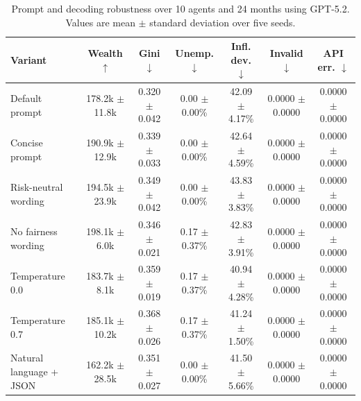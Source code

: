\ifdefined\FinEvoAllowHistoricalPrePZeroEvidence\else
{}
\fi
\begin{table}[t]
\centering
\small
\setlength{\tabcolsep}{4pt}
\begin{tabular}{lcccccc}
\toprule
Variant & Wealth $\uparrow$ & Gini $\downarrow$ & Unemp. $\downarrow$ & Infl. dev. $\downarrow$ & Invalid $\downarrow$ & API err. $\downarrow$ \\
\midrule
Default prompt & 178.2k $\pm$ 11.8k & 0.320 $\pm$ 0.042 & 0.00 $\pm$ 0.00\% & 42.09 $\pm$ 4.17\% & 0.0000 $\pm$ 0.0000 & 0.0000 $\pm$ 0.0000 \\
Concise prompt & 190.9k $\pm$ 12.9k & 0.339 $\pm$ 0.033 & 0.00 $\pm$ 0.00\% & 42.64 $\pm$ 4.59\% & 0.0000 $\pm$ 0.0000 & 0.0000 $\pm$ 0.0000 \\
Risk-neutral wording & 194.5k $\pm$ 23.9k & 0.349 $\pm$ 0.042 & 0.00 $\pm$ 0.00\% & 43.83 $\pm$ 3.83\% & 0.0000 $\pm$ 0.0000 & 0.0000 $\pm$ 0.0000 \\
No fairness wording & 198.1k $\pm$ 6.0k & 0.346 $\pm$ 0.021 & 0.17 $\pm$ 0.37\% & 42.83 $\pm$ 3.91\% & 0.0000 $\pm$ 0.0000 & 0.0000 $\pm$ 0.0000 \\
Temperature 0.0 & 183.7k $\pm$ 8.1k & 0.359 $\pm$ 0.019 & 0.17 $\pm$ 0.37\% & 40.94 $\pm$ 4.28\% & 0.0000 $\pm$ 0.0000 & 0.0000 $\pm$ 0.0000 \\
Temperature 0.7 & 185.1k $\pm$ 10.2k & 0.368 $\pm$ 0.026 & 0.17 $\pm$ 0.37\% & 41.24 $\pm$ 1.50\% & 0.0000 $\pm$ 0.0000 & 0.0000 $\pm$ 0.0000 \\
Natural language + JSON & 162.2k $\pm$ 28.5k & 0.351 $\pm$ 0.027 & 0.00 $\pm$ 0.00\% & 41.50 $\pm$ 5.66\% & 0.0000 $\pm$ 0.0000 & 0.0000 $\pm$ 0.0000 \\
\bottomrule
\end{tabular}
\caption{Prompt and decoding robustness over 10 agents and 24 months using GPT-5.2. Values are mean $\pm$ standard deviation over five seeds.}
\label{tab:prompt_robustness}
\end{table}
